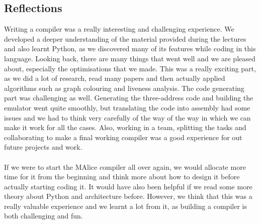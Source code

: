 \documentclass[a4wide, 11pt]{article}
\begin{document}
\subsection{Reflections}
Writing a compiler was a really interesting and challenging experience. We developed a deeper understanding of the material provided during the lectures and also learnt Python, as we discovered many of its features while coding in this language. Looking back, there are many things that went well and we are pleased about, especially the optimisations that we made. This was a really exciting part, as we did a lot of research, read many papers and then actually applied algorithms such as graph colouring and liveness analysis. The code generating part was  challenging as well. Generating the three-address code and building the emulator went quite smoothly, but translating the code into assembly had some issues and we had to think very carefully of the way of the way in which we can make it work for all the cases. Also, working in a team, splitting the tasks and collaborating to make a final working compiler was a good experience for out future projects and work. 
\\\\
If we were to start the MAlice compiler all over again, we would allocate more time for it from the beginning and think more about how to design it before actually starting coding it. It would have also been helpful if we read some more theory about Python and architecture before. However, we think that this was a really valuable experience and we learnt a lot from it, as building a compiler is both challenging and fun.                  
\end{document}
